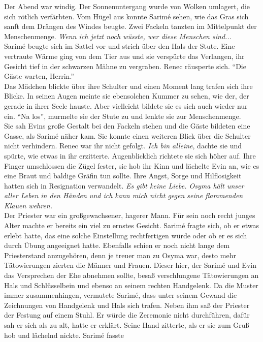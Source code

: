 Der Abend war windig. Der Sonnenuntergang wurde von Wolken umlagert, die sich rötlich verfärbten. 
Vom Hügel aus konnte Sarimé sehen, wie das Gras sich sanft dem Drängen des Windes beugte. Zwei 
Fackeln tanzten im Mittelpunkt der Menschenmenge. \textit{Wenn ich jetzt noch wüsste, wer diese 
Menschen sind...}\\
Sarimé beugte sich im Sattel vor und strich über den Hals der Stute. Eine vertraute Wärme ging von 
dem Tier aus und sie verspürte das Verlangen, ihr Gesicht tief in der schwarzen Mähne zu vergraben.
Renec räusperte sich. ``Die Gäste warten, Herrin.''\\
Das Mädchen blickte über ihre Schulter und einen Moment lang trafen sich ihre Blicke. In seinen 
Augen meinte sie ebensolchen Kummer zu sehen, wie der, der gerade in ihrer Seele hauste. Aber 
vielleicht bildete sie es sich auch wieder nur ein. ``Na los'', murmelte sie der Stute zu und 
lenkte sie zur Menschenmenge.\\
Sie sah Evins große Gestalt bei den Fackeln stehen und die Gäste bildeten eine Gasse, als Sarimé 
näher kam. Sie konnte einen weiteren Blick über die Schulter nicht verhindern. Renec war ihr nicht 
gefolgt. \textit{Ich bin alleine}, dachte sie und spürte, wie etwas in ihr erzitterte.
Augenblicklich richtete sie sich höher auf. Ihre Finger umschlossen die Zügel fester, sie hob ihr 
Kinn und lächelte Evin an, wie es eine Braut und baldige Gräfin tun sollte. Ihre Angst, Sorge und 
Hilflosigkeit hatten sich in Resignation verwandelt. \textit{Es gibt keine Liebe. Osyma hält unser 
aller Leben in den Händen und ich kann mich nicht gegen seine flammenden Klauen wehren.}\\
Der Priester war ein großgewachsener, hagerer Mann. Für sein noch recht junges Alter machte er 
bereits ein viel zu ernstes Gesicht. Sarimé fragte sich, ob er etwas erlebt hatte, das eine solche 
Einstellung rechtfertigen würde oder ob er es sich durch Übung angeeignet hatte. Ebenfalls schien 
er noch nicht lange dem Priesterstand anzugehören, denn je treuer man zu Osyma war, desto mehr 
Tätowierungen zierten die Männer und Frauen. Dieser hier, der Sarimé und Evin das Versprechen der 
Ehe abnehmen sollte, besaß verschlungene Tätowierungen an Hals und Schlüsselbein und ebenso an 
seinem rechten Handgelenk. Da die Muster immer zusammenhingen, vermutete Sarimé, dass unter seinem 
Gewand die Zeichnungen von Handgelenk und Hals sich trafen. Neben ihm saß der Priester der 
Festung auf einem Stuhl. Er würde die Zeremonie nicht durchführen, dafür sah er sich als zu alt, 
hatte er erklärt. Seine Hand zitterte, als er sie zum Gruß hob und lächelnd nickte. Sarimé fasste 

